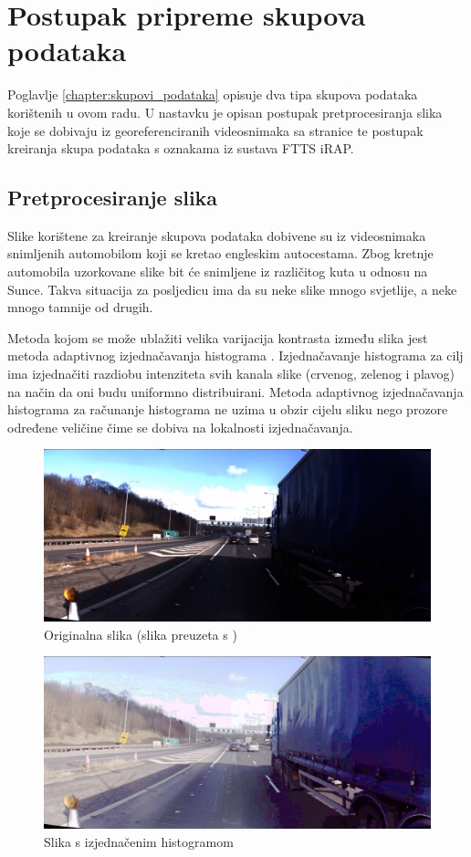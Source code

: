 \documentclass[times, utf8, diplomski, numeric]{fer}
\begin{document}
\section{Postupak pripreme skupova podataka}
Poglavlje \ref{chapter:skupovi_podataka} opisuje dva tipa skupova podataka korištenih u ovom radu.
U nastavku je opisan postupak pretprocesiranja slika koje se dobivaju iz georeferenciranih videosnimaka sa stranice \citep{url:ftts_irap} te postupak kreiranja skupa podataka s oznakama iz sustava FTTS iRAP.

\subsection{Pretprocesiranje slika}
Slike korištene za kreiranje skupova podataka dobivene su iz videosnimaka snimljenih automobilom koji se kretao engleskim autocestama.
Zbog kretnje automobila uzorkovane slike bit će snimljene iz različitog kuta u odnosu na Sunce.
Takva situacija za posljedicu ima da su neke slike mnogo svjetlije, a neke mnogo tamnije od drugih.

Metoda kojom se može ublažiti velika varijacija kontrasta između slika jest metoda adaptivnog izjednačavanja histograma \citep{article:adapt_hist}.
Izjednačavanje histograma za cilj ima izjednačiti razdiobu intenziteta svih kanala slike (crvenog, zelenog i plavog) na način da oni budu uniformno distribuirani.
Metoda adaptivnog izjednačavanja histograma za računanje histograma ne uzima u obzir cijelu sliku nego prozore određene veličine čime se dobiva na lokalnosti izjednačavanja.

\begin{figure}[H]
\centering
\includegraphics[scale=0.2]{images/original.png}
\caption{Originalna slika (slika preuzeta s \citep{url:ftts_irap})}
\label{img:original}
\end{figure}

\begin{figure}[H]
\centering
\includegraphics[scale=0.2]{images/hist.png}
\caption{Slika s izjednačenim histogramom}
\label{img:hist}
\end{figure}
\end{document}
